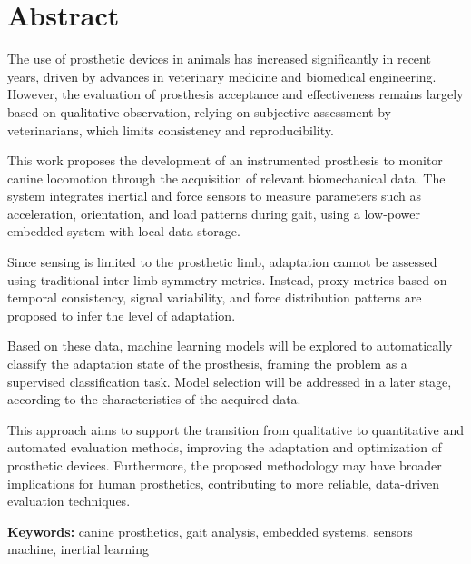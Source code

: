 
\section*{Abstract}


The use of prosthetic devices in animals has increased significantly in recent years, driven by advances in veterinary medicine and biomedical engineering. However, the evaluation of prosthesis acceptance and effectiveness remains largely based on qualitative observation, relying on subjective assessment by veterinarians, which limits consistency and reproducibility.

This work proposes the development of an instrumented prosthesis to monitor canine locomotion through the acquisition of relevant biomechanical data. The system integrates inertial and force sensors to measure parameters such as acceleration, orientation, and load patterns during gait, using a low-power embedded system with local data storage.

Since sensing is limited to the prosthetic limb, adaptation cannot be assessed using traditional inter-limb symmetry metrics. Instead, proxy metrics based on temporal consistency, signal variability, and force distribution patterns are proposed to infer the level of adaptation.

Based on these data, machine learning models will be explored to automatically classify the adaptation state of the prosthesis, framing the problem as a supervised classification task. Model selection will be addressed in a later stage, according to the characteristics of the acquired data.

This approach aims to support the transition from qualitative to quantitative and automated evaluation methods, improving the adaptation and optimization of prosthetic devices. Furthermore, the proposed methodology may have broader implications for human prosthetics, contributing to more reliable, data-driven evaluation techniques.

\vfill

\textbf{\Large Keywords:} canine prosthetics, gait analysis, embedded systems, sensors machine, inertial  learning



